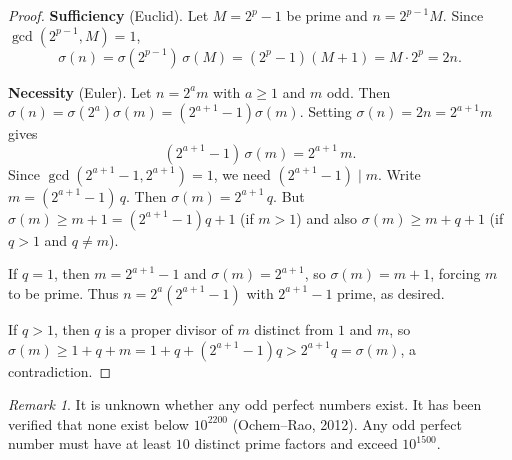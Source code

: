\documentclass[12pt,a4paper,openany]{book}
\theoremstyle{definition}
\theoremstyle{plain}
\theoremstyle{remark}
\newtheorem{remark}[definition]{Remark}
\begin{document}
\begin{proof}
\textbf{Sufficiency} (Euclid).
Let $M = 2^p - 1$ be prime and $n = 2^{p-1}M$.  Since $\gcd(2^{p-1},M) = 1$,
\[
  \sigma(n) = \sigma(2^{p-1})\,\sigma(M)
            = (2^p - 1)(M + 1)
            = M \cdot 2^p = 2n.
\]

\textbf{Necessity} (Euler).
Let $n = 2^{a} m$ with $a \ge 1$ and $m$ odd.  Then
$\sigma(n) = \sigma(2^a)\sigma(m) = (2^{a+1}-1)\sigma(m)$.
Setting $\sigma(n) = 2n = 2^{a+1}m$ gives
\[
  (2^{a+1}-1)\,\sigma(m) = 2^{a+1}\,m.
\]
Since $\gcd(2^{a+1}-1, 2^{a+1}) = 1$, we need $(2^{a+1}-1) \mid m$.
Write $m = (2^{a+1}-1)\,q$.  Then
$\sigma(m) = 2^{a+1}\,q$.  But $\sigma(m) \ge m + 1 = (2^{a+1}-1)q + 1$
(if $m > 1$) and also $\sigma(m) \ge m + q + 1$ (if $q > 1$ and $q \neq m$).

If $q = 1$, then $m = 2^{a+1}-1$ and $\sigma(m) = 2^{a+1}$, so
$\sigma(m) = m + 1$, forcing $m$ to be prime.
Thus $n = 2^a(2^{a+1}-1)$ with $2^{a+1}-1$ prime, as desired.

If $q > 1$, then $q$ is a proper divisor of $m$ distinct from $1$ and $m$,
so $\sigma(m) \ge 1 + q + m = 1 + q + (2^{a+1}-1)q > 2^{a+1}q = \sigma(m)$,
a contradiction.
\end{proof}

\begin{remark}\label{rem:odd-perfect}
It is unknown whether any odd perfect numbers exist.  It has been verified
that none exist below $10^{2200}$ (Ochem--Rao, 2012).  Any odd perfect number
must have at least $10$ distinct prime factors and exceed $10^{1500}$.
\end{remark}

\begin{center}
\label{fig:divisor-lattice}
\end{center}
\end{document}
